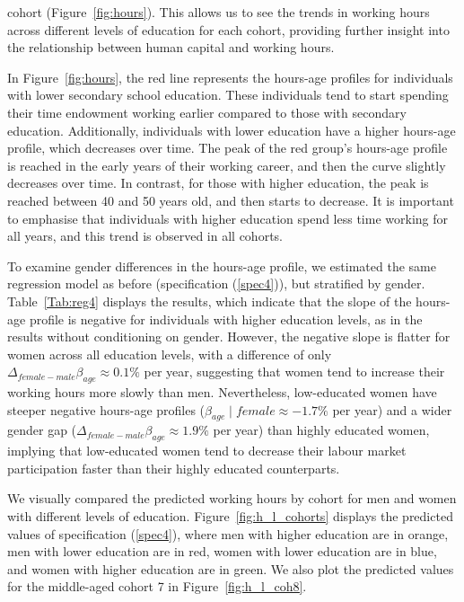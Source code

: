 \documentclass[12pt]{article}
\begin{document}
cohort (Figure~\ref{fig:hours}). This allows us to see the trends in working hours across different levels of education
for each cohort, providing further insight into the relationship between human capital and working hours.
\par
In Figure~\ref{fig:hours}, the red line represents the hours-age profiles for individuals with lower secondary school
education. These individuals tend to start spending their time endowment working earlier compared to those with
secondary education. Additionally, individuals with lower education have a higher hours-age profile, which decreases
over time. The peak of the red group's hours-age profile is reached in the early years of their working career, and then
the curve slightly decreases over time. In contrast, for those with higher education, the peak is reached between 40 and
50 years old, and then starts to decrease. It is important to emphasise that individuals with higher education spend
less time working for all years, and this trend is observed in all cohorts.
\par
To examine gender differences in the hours-age profile, we estimated the same regression model as before (specification
(\ref{spec4})), but stratified by gender. Table~\ref{Tab:reg4} displays the results, which indicate that the slope of the
hours-age profile is negative for individuals with higher education levels, as in the results without conditioning on gender.
However, the negative slope is flatter for women across all education levels, with a difference of only
$\Delta_{female-male}\beta_{age} \approx 0.1\%$ per year, suggesting that women tend to increase their working hours more
slowly than men. Nevertheless, low-educated women have steeper negative hours-age profiles ($\beta_{age}\mid female
\approx -1.7\%$ per year) and a wider gender gap ($\Delta_{female-male}\beta_{age} \approx 1.9\%$ per year) than highly
educated women, implying that low-educated women tend to decrease their labour market participation faster than their
highly educated counterparts.

\par
We visually compared the predicted working hours by cohort for men and women with different levels of education.
Figure~\ref{fig:h_l_cohorts} displays the predicted values of specification (\ref{spec4}), where men with higher
education are in orange, men with lower education are in red, women with lower education are in blue, and women
with higher education are in green. We also plot the predicted values for the middle-aged cohort 7 in Figure~\ref{fig:h_l_coh8}.
\end{document}
